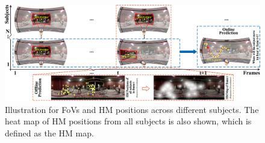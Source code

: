 \documentclass[10pt,journal,compsoc]{IEEEtran}
\begin{document}
\begin{figure}
	\begin{center}
		\centerline{\includegraphics[width=1.6\columnwidth]{figures/introduction/fig_one}}
		\caption{Illustration for FoVs and HM positions across different subjects. The heat map of HM positions from all subjects is also shown, which is defined as the HM map.}
		\label{fig-one}
	\end{center}
\end{figure}
\end{document}
